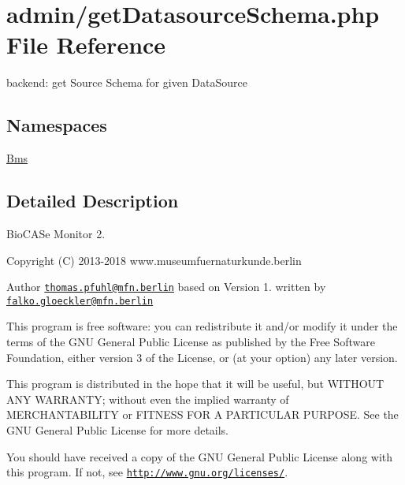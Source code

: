 \hypertarget{get_datasource_schema_8php}{}\section{admin/get\+Datasource\+Schema.php File Reference}
\label{get_datasource_schema_8php}


backend\+: get Source Schema for given Data\+Source  


\subsection*{Namespaces}
\begin{DoxyCompactItemize}
\item 
 \hyperlink{namespace_bms}{Bms}
\end{DoxyCompactItemize}


\subsection{Detailed Description}
Bio\+C\+A\+Se Monitor 2. \begin{DoxyCopyright}{Copyright}
(C) 2013-\/2018 www.\+museumfuernaturkunde.\+berlin 
\end{DoxyCopyright}
\begin{DoxyAuthor}{Author}
\href{mailto:thomas.pfuhl@mfn.berlin}{\tt thomas.\+pfuhl@mfn.\+berlin} based on Version 1. written by \href{mailto:falko.gloeckler@mfn.berlin}{\tt falko.\+gloeckler@mfn.\+berlin}
\end{DoxyAuthor}
This program is free software\+: you can redistribute it and/or modify it under the terms of the G\+NU General Public License as published by the Free Software Foundation, either version 3 of the License, or (at your option) any later version.

This program is distributed in the hope that it will be useful, but W\+I\+T\+H\+O\+UT A\+NY W\+A\+R\+R\+A\+N\+TY; without even the implied warranty of M\+E\+R\+C\+H\+A\+N\+T\+A\+B\+I\+L\+I\+TY or F\+I\+T\+N\+E\+SS F\+OR A P\+A\+R\+T\+I\+C\+U\+L\+AR P\+U\+R\+P\+O\+SE. See the G\+NU General Public License for more details.

You should have received a copy of the G\+NU General Public License along with this program. If not, see \href{http://www.gnu.org/licenses/}{\tt http\+://www.\+gnu.\+org/licenses/}. 